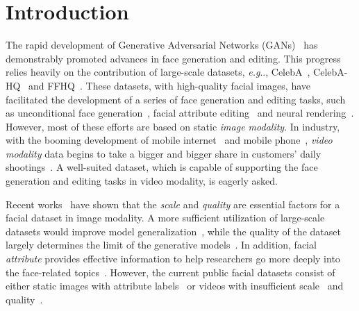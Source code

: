 \documentclass[runningheads]{llncs}
\makeatletter
\DeclareRobustCommand\onedot{\futurelet\@let@token\@onedot}
\def\@onedot{\ifx\@let@token.\else.\null\fi\xspace}
\def\eg{\emph{e.g}\onedot} \def\Eg{\emph{E.g}\onedot}
\makeatother
\begin{document}
\section{Introduction}
\begin{sloppypar}
    
The rapid development of Generative Adversarial Networks (GANs)~\cite{gan,dcgan,celebahq,stylegan,stylegan2,stylegan3} has demonstrably promoted advances in face generation and editing.
This progress relies heavily on the contribution of large-scale datasets, \eg, CelebA~\cite{celeba15}, CelebA-HQ~\cite{celebahq} and FFHQ~\cite{stylegan}.
These datasets, with high-quality facial images, have facilitated the development of a series of face generation and editing tasks, such as unconditional face generation~\cite{gan,dcgan,stylegan,stylegan2,mocoganhd,digan,styleganv,DBLP:conf/nips/JiangDWL21}, facial attribute editing~\cite{starganv2,munit,interfacegan,e4e,xu2022transeditor} and neural rendering~\cite{headnerf,stylenerf,or2021stylesdf,chan2021pigan,or2021stylesdf,eg3d,guo2021adnerf,Gafni_2021_CVPR,chen2022sem2nerf}.
However, most of these efforts are based on static \textit{image modality}. In industry, with the booming development of mobile internet~\cite{iotsurvey} and mobile phone~\cite{yang2019analysis}, \textit{video modality} data begins to take a bigger and bigger share in customers' daily shootings~\cite{snapchat,tiktok}. A well-suited dataset, which is capable of supporting the face generation and editing tasks in video modality, is eagerly asked.
\end{sloppypar}



Recent works~\cite{stylegan2,brock2018large} have shown that the \textit{scale} and \textit{quality} are essential factors for a facial dataset in image modality. A more sufficient utilization of large-scale datasets would improve model generalization~\cite{schmidt2018adversarially}, while the quality of the dataset largely determines the limit of the generative models~\cite{dcgan,stylegan,stylegan2,mocoganhd,digan,styleganv}. In addition, facial \textit{attribute} provides effective information to help researchers go more deeply into the face-related topics~\cite{celeba15,munit,starganv2,interfacegan}. However, the current public facial datasets consist of either static images with attribute labels~\cite{celeba15,celebahq} or videos with insufficient scale~\cite{mead} and quality~\cite{vox17,vox2}.
\end{document}
